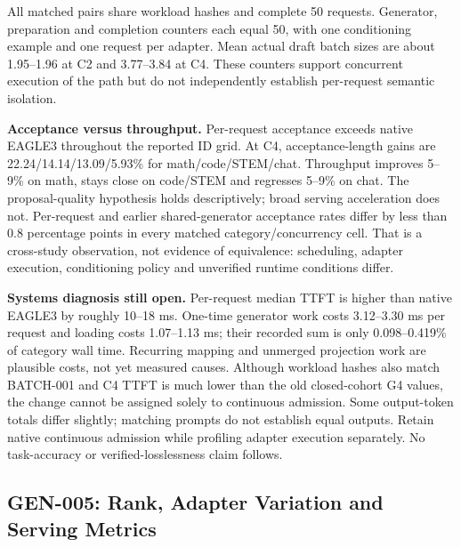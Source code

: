 All matched pairs share workload hashes and complete 50 requests. Generator,
preparation and completion counters each equal 50, with one conditioning example
and one request per adapter. Mean actual draft batch sizes are about 1.95--1.96
at C2 and 3.77--3.84 at C4. These counters support concurrent execution of the
path but do not independently establish per-request semantic isolation.




\textbf{Acceptance versus throughput.} Per-request acceptance exceeds native
EAGLE3 throughout the reported ID grid. At C4, acceptance-length gains are
22.24/14.14/13.09/5.93\% for math/code/STEM/chat. Throughput improves 5--9\% on
math, stays close on code/STEM and regresses 5--9\% on chat. The proposal-quality
hypothesis holds descriptively; broad serving acceleration does not.
Per-request and earlier shared-generator acceptance rates differ by less than
0.8 percentage points in every matched category/concurrency cell. That is a
cross-study observation, not evidence of equivalence: scheduling, adapter
execution, conditioning policy and unverified runtime conditions differ.



\textbf{Systems diagnosis still open.} Per-request median TTFT is higher than
native EAGLE3 by roughly 10--18 ms. One-time generator work costs 3.12--3.30 ms
per request and loading costs 1.07--1.13 ms; their recorded sum is only
0.098--0.419\% of category wall time. Recurring mapping and unmerged projection
work are plausible costs, not yet measured causes. Although workload hashes
also match BATCH-001 and C4 TTFT is much lower than the old closed-cohort G4
values, the change cannot be assigned solely to continuous admission. Some
output-token totals differ slightly; matching prompts do not establish equal
outputs. Retain native continuous admission while profiling adapter execution
separately. No task-accuracy or verified-losslessness claim follows.

\subsection{GEN-005: Rank, Adapter Variation and Serving Metrics}

